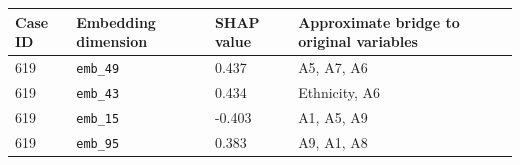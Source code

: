 \begin{tabular}{llll}
\toprule
Case ID & Embedding dimension & SHAP value & Approximate bridge to original variables \\
\midrule
619 & \texttt{emb\_49} & 0.437 & A5, A7, A6 \\
619 & \texttt{emb\_43} & 0.434 & Ethnicity, A6 \\
619 & \texttt{emb\_15} & -0.403 & A1, A5, A9 \\
619 & \texttt{emb\_95} & 0.383 & A9, A1, A8 \\
\bottomrule
\end{tabular}
